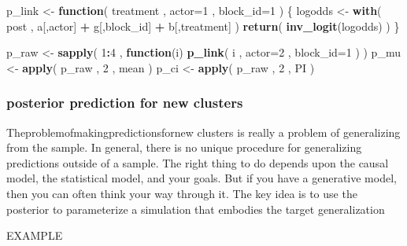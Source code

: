 \documentclass[
]{article}
\newenvironment{Shaded}{\begin{snugshade}}{\end{snugshade}}
\newcommand{\ControlFlowTok}[1]{\textcolor[rgb]{0.13,0.29,0.53}{\textbf{#1}}}
\newcommand{\DataTypeTok}[1]{\textcolor[rgb]{0.13,0.29,0.53}{#1}}
\newcommand{\DecValTok}[1]{\textcolor[rgb]{0.00,0.00,0.81}{#1}}
\newcommand{\KeywordTok}[1]{\textcolor[rgb]{0.13,0.29,0.53}{\textbf{#1}}}
\newcommand{\NormalTok}[1]{#1}
\newcommand{\OperatorTok}[1]{\textcolor[rgb]{0.81,0.36,0.00}{\textbf{#1}}}
\newcommand{\StringTok}[1]{\textcolor[rgb]{0.31,0.60,0.02}{#1}}
\begin{document}
\begin{Shaded}
\begin{Highlighting}[]
\NormalTok{ p_link <-}\StringTok{ }\ControlFlowTok{function}\NormalTok{( treatment , }\DataTypeTok{actor=}\DecValTok{1}\NormalTok{ , }\DataTypeTok{block_id=}\DecValTok{1}\NormalTok{ ) \{ }
\NormalTok{   logodds <-}\StringTok{ }\KeywordTok{with}\NormalTok{( post ,}
\NormalTok{a[,actor] }\OperatorTok{+}\StringTok{ }\NormalTok{g[,block_id] }\OperatorTok{+}\StringTok{ }\NormalTok{b[,treatment] ) }
   \KeywordTok{return}\NormalTok{( }\KeywordTok{inv_logit}\NormalTok{(logodds) )}
\NormalTok{ \}}
 
\NormalTok{p_raw <-}\StringTok{ }\KeywordTok{sapply}\NormalTok{( }\DecValTok{1}\OperatorTok{:}\DecValTok{4}\NormalTok{ , }\ControlFlowTok{function}\NormalTok{(i) }\KeywordTok{p_link}\NormalTok{( i , }\DataTypeTok{actor=}\DecValTok{2}\NormalTok{ , }\DataTypeTok{block_id=}\DecValTok{1}\NormalTok{ ) ) }
\NormalTok{p_mu <-}\StringTok{ }\KeywordTok{apply}\NormalTok{( p_raw , }\DecValTok{2}\NormalTok{ , mean )}
\NormalTok{p_ci <-}\StringTok{ }\KeywordTok{apply}\NormalTok{( p_raw , }\DecValTok{2}\NormalTok{ , PI )}
\end{Highlighting}
\end{Shaded}

\hypertarget{posterior-prediction-for-new-clusters}{%
\subsubsection{posterior prediction for new
clusters}\label{posterior-prediction-for-new-clusters}}

Theproblemofmakingpredictionsfornew clusters is really a problem of
generalizing from the sample. In general, there is no unique procedure
for generalizing predictions outside of a sample. The right thing to do
depends upon the causal model, the statistical model, and your goals.
But if you have a generative model, then you can often think your way
through it. The key idea is to use the posterior to parameterize a
simulation that embodies the target generalization

EXAMPLE
\end{document}
